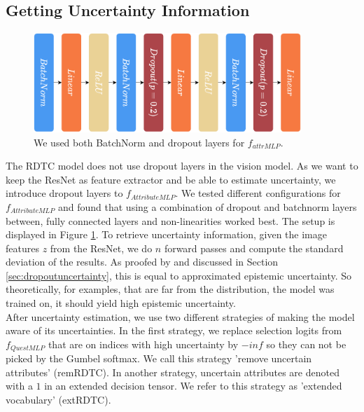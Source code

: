 \documentclass[a4paper,cleardoubleempty,BCOR1cm, 11pt]{report}
\begin{document}
\subsection{Getting Uncertainty Information}
\begin{figure}
	\centering
	\includegraphics[width=0.9\textwidth]{images/f_attrMLP.pdf} 
	\caption{We used both BatchNorm and dropout layers for $f_{attrMLP}$.}
	\label{fig:f_attrMLP}
\end{figure}
The RDTC model does not use dropout layers in the vision model. As we want to keep the ResNet as feature extractor and be able to estimate uncertainty, we introduce dropout layers to $f_{AttributeMLP}$. We tested different configurations for $f_{AttributeMLP}$ and found that using a combination of dropout and batchnorm layers between, fully connected layers and non-linearities worked best. The setup is displayed in Figure \ref{fig:f_attrMLP}. To retrieve uncertainty information, given the image features $z$ from the ResNet, we do $n$ forward passes and compute the standard deviation of the results. As proofed by \citet{gal2016dropout} and discussed in Section \ref{sec:dropoutuncertainty}, this is equal to approximated epistemic uncertainty. So theoretically, for examples, that are far from the distribution, the model was trained on, it should yield high epistemic uncertainty.\\
After uncertainty estimation, we use two different strategies of making the model aware of its uncertainties. In the first strategy, we replace selection logits from $f_{QuestMLP}$ that are on indices with high uncertainty by $-inf$ so they can not be picked by the Gumbel softmax. We call this strategy 'remove uncertain attributes' (remRDTC). In another strategy, uncertain attributes are denoted with a $1$ in an extended decision tensor. We refer to this strategy as 'extended vocabulary' (extRDTC).
\end{document}
